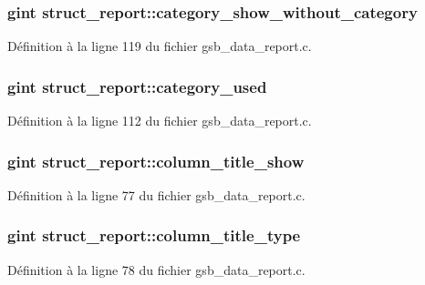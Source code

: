 \subsubsection[{category\_\-show\_\-without\_\-category}]{\setlength{\rightskip}{0pt plus 5cm}gint {\bf struct\_\-report::category\_\-show\_\-without\_\-category}}\label{structstruct__report_ad50fad5557c73d96a5e8869b6d8bf933}


Définition à la ligne 119 du fichier gsb\_\-data\_\-report.c.

\subsubsection[{category\_\-used}]{\setlength{\rightskip}{0pt plus 5cm}gint {\bf struct\_\-report::category\_\-used}}\label{structstruct__report_a02fdee7d77522897a9b11783053f3b9f}


Définition à la ligne 112 du fichier gsb\_\-data\_\-report.c.

\subsubsection[{column\_\-title\_\-show}]{\setlength{\rightskip}{0pt plus 5cm}gint {\bf struct\_\-report::column\_\-title\_\-show}}\label{structstruct__report_ad7166b57d7d8250b8987c832a1169be9}


Définition à la ligne 77 du fichier gsb\_\-data\_\-report.c.

\subsubsection[{column\_\-title\_\-type}]{\setlength{\rightskip}{0pt plus 5cm}gint {\bf struct\_\-report::column\_\-title\_\-type}}\label{structstruct__report_ad27fb68dbad4347aab818b0b8a1333dd}


Définition à la ligne 78 du fichier gsb\_\-data\_\-report.c.

